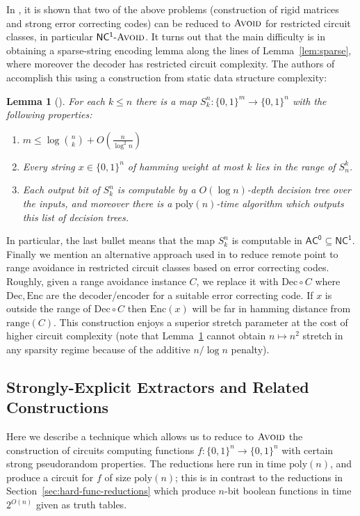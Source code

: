 \documentclass[11pt]{article}
\newtheorem{lemma}{Lemma}
\newcommand{\dash}{\text{-}}
\newcommand{\B}{\{0,1\}}
\newcommand{\poly}{\mathrm{poly}}
\newcommand{\avoid}{\textsc{Avoid}}
\begin{document}
In \cite{low-depth-avoid}, it is shown that two of the above problems (construction of rigid matrices and strong error correcting codes) can be reduced to $\avoid$ for restricted circuit classes, in particular $\mathsf{NC^1}\dash\avoid$. It turns out that the main difficulty is in obtaining a sparse-string encoding lemma along the lines of Lemma~\ref{lem:sparse}, where moreover the decoder has restricted circuit complexity. The authors of \cite{low-depth-avoid} accomplish this using a construction from static data structure complexity:
\begin{lemma}[\cite{low-depth-avoid,succincter}]\label{lem:succincter}
For each $k \leq n$ there is a map $S^n_k: \B^m \to \B^n$ with the following properties:
\begin{enumerate}
	\item $m \leq \log\binom{n}{k} + O(\frac{n}{\log^2 n})$
	\item Every string $x\in \B^n$ of hamming weight at most $k$ lies in the range of $S_n^k$.
	\item Each output bit of $S_k^n$ is computable by a $O(\log n)$-depth decision tree over the inputs, and moreover there is a $\poly(n)$-time algorithm which outputs this list of decision trees.
\end{enumerate}
\end{lemma}

In particular, the last bullet means that the map $S_k^n$ is computable in $\mathsf{AC^0} \subseteq \mathsf{NC^1}$. Finally we mention an alternative approach used in \cite{hard-partial} to reduce remote point to range avoidance in restricted circuit classes based on error correcting codes. Roughly, given a range avoidance instance $C$, we replace it with $\mathrm{Dec} \circ C$ where $\mathrm{Dec}, \mathrm{Enc}$ are the decoder/encoder for a suitable error correcting code. If $x$ is outside the range of $\mathrm{Dec} \circ C$ then $\mathrm{Enc}(x)$ will be far in hamming distance from $\mathrm{range}(C)$. This construction enjoys a superior stretch parameter at the cost of higher circuit complexity (note that Lemma~\ref{lem:succincter} cannot obtain $n \mapsto n^2$ stretch in any sparsity regime because of the additive $n/\log n$ penalty).

\subsection{Strongly-Explicit Extractors and Related Constructions}\label{sec:extractor}
Here we describe a technique which allows us to reduce to $\avoid$ the construction of circuits computing functions $f: \B^n \to \B^n$ with certain strong pseudorandom properties. The reductions here run in time $\poly(n)$, and produce a circuit for $f$ of size $\poly(n)$; this is in contrast to the reductions in Section~\ref{sec:hard-func-reductions} which produce $n$-bit boolean functions in time $2^{O(n)}$ given as truth tables.
\end{document}
